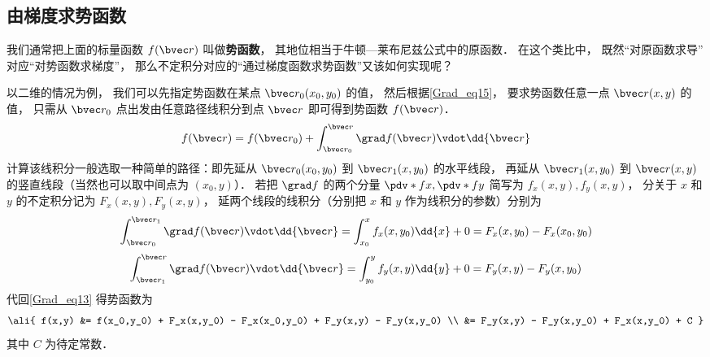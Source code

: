 \subsection{由梯度求势函数}
我们通常把上面的标量函数 $f(\bvec r)$ 叫做\textbf{势函数}， 其地位相当于牛顿—莱布尼兹公式中的原函数． 在这个类比中， 既然“对原函数求导” 对应“对势函数求梯度”， 那么不定积分对应的“通过梯度函数求势函数”又该如何实现呢？

以二维的情况为例， 我们可以先指定势函数在某点 $\bvec r_0 (x_0,y_0)$ 的值， 然后根据\autoref{Grad_eq15}， 要求势函数任意一点 $\bvec r (x,y)$ 的值， 只需从 $\bvec r_0$ 点出发由任意路径线积分到点 $\bvec r$ 即可得到势函数 $f(\bvec r)$．
\begin{equation}\label{Grad_eq13}
f(\bvec r) =  f(\bvec r_0) + \int_{\bvec r_0}^{\bvec r} \grad f(\bvec r) \vdot \dd{\bvec r} 
\end{equation}
计算该线积分一般选取一种简单的路径：即先延从 $\bvec r_0(x_0,y_0)$ 到 $\bvec r_1(x, y_0)$ 的水平线段， 再延从 $\bvec r_1(x, y_0)$ 到 $\bvec r(x,y)$ 的竖直线段（当然也可以取中间点为 $(x_0,y)$）． 若把 $\grad f$ 的两个分量 $\pdv*{f}{x}, \pdv*{f}{y}$ 简写为 $f_x(x,y), f_y(x,y)$， 分关于 $x$ 和 $y$ 的不定积分记为 $F_x(x,y), F_y(x,y)$， 延两个线段的线积分（分别把 $x$ 和 $y$ 作为线积分的参数）分别为
\begin{equation}
 \int_{\bvec r_0}^{\bvec r_1} \grad f(\bvec r) \vdot \dd{\bvec r} = \int_{x_0}^{x} f_x(x,y_0) \dd{x} + 0 = F_x(x,y_0) - F_x(x_0,y_0)
\end{equation}
\begin{equation}
 \int_{\bvec r_1}^{\bvec r} \grad f(\bvec r) \vdot \dd{\bvec r} = \int_{y_0}^{y} f_y(x,y) \dd{y} + 0 = F_y(x,y) - F_y(x,y_0)
\end{equation}
代回\autoref{Grad_eq13} 得势函数为
\begin{equation}\label{Grad_eq23}\ali{
f(x,y) &= f(x_0,y_0) + F_x(x,y_0) - F_x(x_0,y_0) + F_y(x,y) - F_y(x,y_0) \\
&= F_y(x,y) - F_y(x,y_0) + F_x(x,y_0) + C
}\end{equation}
其中 $C$ 为待定常数．
